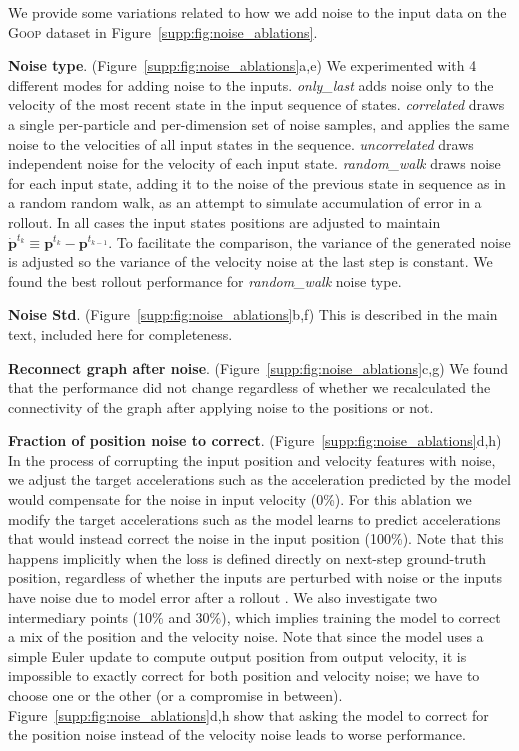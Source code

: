 \documentclass{article}
\newcommand{\xhdr}[1]{{\noindent\bfseries #1}.}
\newcommand\figref[1]{Figure~\ref{#1}}
\newcommand\domain[1]{\textsc{#1}}
\begin{document}
We provide some variations related to how we add noise to the input data on the \domain{Goop} dataset in \figref{supp:fig:noise_ablations}.

\xhdr{Noise type}
(\figref{supp:fig:noise_ablations}a,e) We experimented with 4 different modes for adding noise to the inputs. \emph{only\_last} adds noise only to the velocity of the most recent state in the input sequence of states. \emph{correlated} draws a single per-particle and per-dimension set of noise samples, and applies the same noise to the velocities of all input states in the sequence. \emph{uncorrelated} draws independent noise for the velocity of each input state. \emph{random\_walk} draws noise for each input state, adding it to the noise of the previous state in sequence as in a random random walk, as an attempt to simulate accumulation of error in a rollout. In all cases the input states positions are adjusted to maintain $\dot{\mathbf{p}}^{t_k} \equiv \mathbf{p}^{t_{k}} - \mathbf{p}^{t_{k-1}}$. To facilitate the comparison, the variance of the generated noise is adjusted so the variance of the velocity noise at the last step is constant. We found the best rollout performance for \emph{random\_walk} noise type.

\xhdr{Noise Std}
(\figref{supp:fig:noise_ablations}b,f) This is described in the main text, included here for completeness.

\xhdr{Reconnect graph after noise}
(\figref{supp:fig:noise_ablations}c,g) We found that the performance did not change regardless of whether we recalculated the connectivity of the graph after applying noise to the positions or not.

\xhdr{Fraction of position noise to correct}
(\figref{supp:fig:noise_ablations}d,h) In the process of corrupting the input position and velocity features with noise, we adjust the target accelerations such as the acceleration predicted by the model would compensate for the noise in input velocity  (0\%). For this ablation we modify the target accelerations such as the model learns to predict accelerations that would instead correct the noise in the input position (100\%). Note that this happens implicitly when the loss is defined directly on next-step ground-truth position, regardless of whether the inputs are perturbed with noise \cite{sanchez2018graph} or the inputs have noise due to model error after a rollout \cite{ummenhofer2020lagrangian}. We also investigate two intermediary points (10\% and 30\%), which implies training the model to correct a mix of the position and the velocity noise. Note that since the model uses a simple Euler update to compute output position from output velocity, it is impossible to exactly correct for both position and velocity noise; we have to choose one or the other (or a compromise in between). \figref{supp:fig:noise_ablations}d,h show that asking the model to correct for the position noise instead of the velocity noise leads to worse performance.
\end{document}
